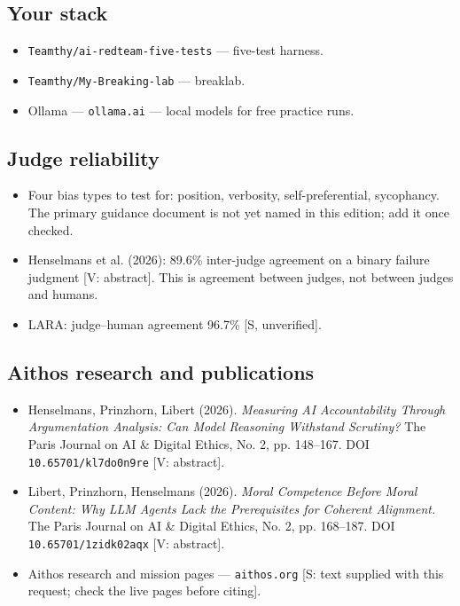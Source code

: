\subsection*{Your stack}
\begin{itemize}
\item \texttt{Teamthy/ai-redteam-five-tests} — five-test harness.
\item \texttt{Teamthy/My-Breaking-lab} — breaklab.
\item Ollama — \texttt{ollama.ai} — local models for free practice runs.
\end{itemize}

\subsection*{Judge reliability}
\begin{itemize}
\item Four bias types to test for: position, verbosity, self-preferential, sycophancy. The primary guidance document is not yet named in this edition; add it once checked.
\item Henselmans et al. (2026): 89.6\% inter-judge agreement on a binary failure judgment [V: abstract]. This is agreement between judges, not between judges and humans.
\item LARA: judge--human agreement 96.7\% [S, unverified].
\end{itemize}

\subsection*{Aithos research and publications}
\begin{itemize}
\item Henselmans, Prinzhorn, Libert (2026). \emph{Measuring AI Accountability Through Argumentation Analysis: Can Model Reasoning Withstand Scrutiny?} The Paris Journal on AI \& Digital Ethics, No. 2, pp. 148--167. DOI \texttt{10.65701/kl7do0n9re} [V: abstract].
\item Libert, Prinzhorn, Henselmans (2026). \emph{Moral Competence Before Moral Content: Why LLM Agents Lack the Prerequisites for Coherent Alignment.} The Paris Journal on AI \& Digital Ethics, No. 2, pp. 168--187. DOI \texttt{10.65701/1zidk02aqx} [V: abstract].
\item Aithos research and mission pages — \texttt{aithos.org} [S: text supplied with this request; check the live pages before citing].
\end{itemize}

